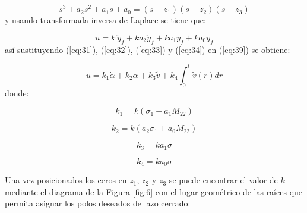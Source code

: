 \documentclass{article}
\begin{document}
\begin{equation}
    s^3+a_2s^2+a_1s+a_0=(s-z_1)(s-z_2)(s-z_3)
    \label{eq:38}
\end{equation}
y usando transformada inversa de Laplace se tiene que:

\begin{equation}
    u=k\:\dddot{y}_f+ka_2\ddot{y}_f+ka_1\dot{y}_f+ka_0y_f
    \label{eq:39}
\end{equation}
así sustituyendo (\ref{eq:31}), (\ref{eq:32}), (\ref{eq:33}) y (\ref{eq:34}) en (\ref{eq:39}) se obtiene:

\begin{equation}
    \boxed{u=k_1\dot{\alpha}+k_2\alpha+k_3\tilde{v}+k_4\int^t_0\tilde{v}(r)dr}
    \label{eq:40}
\end{equation}
donde:

\begin{equation}
    k_1=k(\sigma_1+a_1M_{22})
    \label{eq:41}
\end{equation}

\begin{equation}
    k_2=k(a_2\sigma_1+a_0M_{22})
    \label{eq:42}
\end{equation}

\begin{equation}
    k_3=ka_1\sigma 
    \label{eq:43}
\end{equation}

\begin{equation}
    k_4=ka_0\sigma 
    \label{eq:44}
\end{equation}

Una vez posicionados los ceros en $z_1$, $z_2$ y $z_3$ se puede encontrar el valor de $k$ mediante el diagrama de la Figura \ref{fig:6} con el lugar geométrico de las raíces que permita asignar los polos deseados de lazo cerrado:
\end{document}
